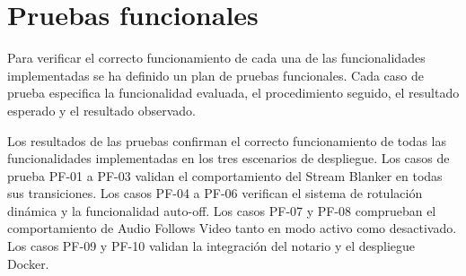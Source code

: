 \section{Pruebas funcionales}

Para verificar el correcto funcionamiento de cada una de las funcionalidades
implementadas se ha definido un plan de pruebas funcionales. Cada caso de prueba
especifica la funcionalidad evaluada, el procedimiento seguido, el resultado esperado
y el resultado observado.


Los resultados de las pruebas confirman el correcto funcionamiento de todas las
funcionalidades implementadas en los tres escenarios de despliegue. Los casos de
prueba PF-01 a PF-03 validan el comportamiento del Stream Blanker en todas sus
transiciones. Los casos PF-04 a PF-06 verifican el sistema de rotulación dinámica
y la funcionalidad auto-off. Los casos PF-07 y PF-08 comprueban el comportamiento
de Audio Follows Video tanto en modo activo como desactivado. Los casos PF-09 y
PF-10 validan la integración del notario y el despliegue Docker.
